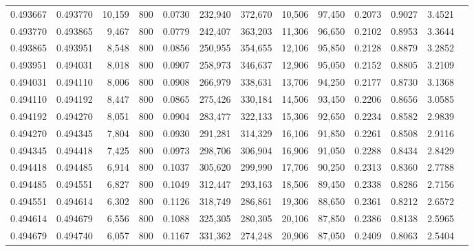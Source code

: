 \begin{tabular}{rrrrrrrrrrrrr}
0.493667 & 0.493770 & 10,159 &   800 &                                     0.0730 & 232,940 & 372,670 &  10,506 &  97,450 & 0.2073 & 0.9027 & 3.4521 \\
0.493770 & 0.493865 &  9,467 &   800 &                                     0.0779 & 242,407 & 363,203 &  11,306 &  96,650 & 0.2102 & 0.8953 & 3.3644 \\
0.493865 & 0.493951 &  8,548 &   800 &                                     0.0856 & 250,955 & 354,655 &  12,106 &  95,850 & 0.2128 & 0.8879 & 3.2852 \\
0.493951 & 0.494031 &  8,018 &   800 &                                     0.0907 & 258,973 & 346,637 &  12,906 &  95,050 & 0.2152 & 0.8805 & 3.2109 \\
0.494031 & 0.494110 &  8,006 &   800 &                                     0.0908 & 266,979 & 338,631 &  13,706 &  94,250 & 0.2177 & 0.8730 & 3.1368 \\
0.494110 & 0.494192 &  8,447 &   800 &                                     0.0865 & 275,426 & 330,184 &  14,506 &  93,450 & 0.2206 & 0.8656 & 3.0585 \\
0.494192 & 0.494270 &  8,051 &   800 &                                     0.0904 & 283,477 & 322,133 &  15,306 &  92,650 & 0.2234 & 0.8582 & 2.9839 \\
0.494270 & 0.494345 &  7,804 &   800 &                                     0.0930 & 291,281 & 314,329 &  16,106 &  91,850 & 0.2261 & 0.8508 & 2.9116 \\
0.494345 & 0.494418 &  7,425 &   800 &                                     0.0973 & 298,706 & 306,904 &  16,906 &  91,050 & 0.2288 & 0.8434 & 2.8429 \\
0.494418 & 0.494485 &  6,914 &   800 &                                     0.1037 & 305,620 & 299,990 &  17,706 &  90,250 & 0.2313 & 0.8360 & 2.7788 \\
0.494485 & 0.494551 &  6,827 &   800 &                                     0.1049 & 312,447 & 293,163 &  18,506 &  89,450 & 0.2338 & 0.8286 & 2.7156 \\
0.494551 & 0.494614 &  6,302 &   800 &                                     0.1126 & 318,749 & 286,861 &  19,306 &  88,650 & 0.2361 & 0.8212 & 2.6572 \\
0.494614 & 0.494679 &  6,556 &   800 &                                     0.1088 & 325,305 & 280,305 &  20,106 &  87,850 & 0.2386 & 0.8138 & 2.5965 \\
0.494679 & 0.494740 &  6,057 &   800 &                                     0.1167 & 331,362 & 274,248 &  20,906 &  87,050 & 0.2409 & 0.8063 & 2.5404 \\

\end{tabular}
